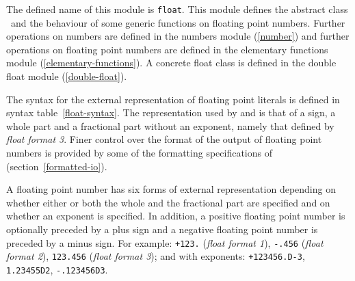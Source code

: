 \label{float}
%
\begin{optDefinition}
\noindent
The defined name of this module is {\tt float}.  This module defines the
abstract class \ and the behaviour of some generic functions on
floating point numbers.  Further operations on numbers are defined in the
numbers module (\ref{number}) and further operations on floating point numbers
are defined in the elementary functions module (\ref{elementary-functions}).  A
concrete float class is defined in the double float module (\ref{double-float}).

%
The syntax for the external representation of floating point literals is defined
in syntax table~\ref{float-syntax}.  The representation used by
 and  is that of a sign, a whole part and a
fractional part without an exponent, namely that defined by {\em float format
    3}.  Finer control over the format of the output of floating point numbers
is provided by some of the formatting specifications of 
(section~\ref{formatted-io}).
%
\Syntax
\label{float-syntax}
%

A floating point number
has six forms of external representation depending on whether either or both the
whole and the fractional part are specified and on whether an exponent is
specified.  In addition, a positive floating point number is optionally preceded
by a plus sign and a negative floating point number is preceded by a minus sign.
For example:
%
\verb|+123.| ({\em float format 1\/}),
\verb|-.456| ({\em float format 2\/}),
\verb|123.456| ({\em float format 3\/}); and with exponents:
\verb|+123456.D-3|,
\verb|1.23455D2|,
\verb|-.123456D3|.


\end{optDefinition}
